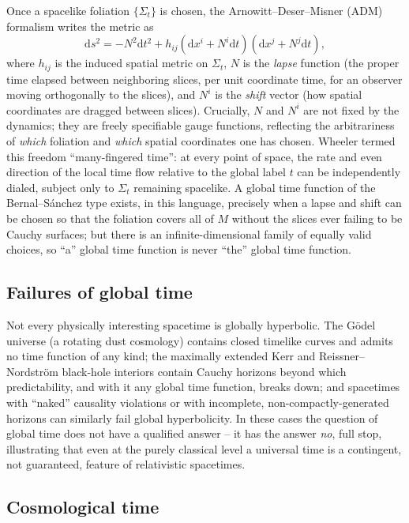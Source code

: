 \documentclass[11pt]{article}
\newcommand{\dd}{\mathrm{d}}
\begin{document}
Once a spacelike foliation $\{\Sigma_t\}$ is chosen, the Arnowitt--Deser--Misner (ADM) formalism writes the metric as
\begin{equation}
\dd s^2 = -N^2\dd t^2 + h_{ij}\left(\dd x^i + N^i \dd t\right)\left(\dd x^j + N^j \dd t\right),
\label{eq:adm}
\end{equation}
where $h_{ij}$ is the induced spatial metric on $\Sigma_t$, $N$ is the \emph{lapse} function (the proper time elapsed between neighboring slices, per unit coordinate time, for an observer moving orthogonally to the slices), and $N^i$ is the \emph{shift} vector (how spatial coordinates are dragged between slices). Crucially, $N$ and $N^i$ are not fixed by the dynamics; they are freely specifiable gauge functions, reflecting the arbitrariness of \emph{which} foliation and \emph{which} spatial coordinates one has chosen. Wheeler termed this freedom ``many-fingered time'': at every point of space, the rate and even direction of the local time flow relative to the global label $t$ can be independently dialed, subject only to $\Sigma_t$ remaining spacelike. A global time function of the Bernal--S\'anchez type exists, in this language, precisely when a lapse and shift can be chosen so that the foliation covers all of $M$ without the slices ever failing to be Cauchy surfaces; but there is an infinite-dimensional family of equally valid choices, so ``a'' global time function is never ``the'' global time function.

\subsection{Failures of global time}

Not every physically interesting spacetime is globally hyperbolic. The G\"odel universe (a rotating dust cosmology) contains closed timelike curves and admits no time function of any kind; the maximally extended Kerr and Reissner--Nordstr\"om black-hole interiors contain Cauchy horizons beyond which predictability, and with it any global time function, breaks down; and spacetimes with ``naked'' causality violations or with incomplete, non-compactly-generated horizons can similarly fail global hyperbolicity. In these cases the question of global time does not have a qualified answer -- it has the answer \emph{no}, full stop, illustrating that even at the purely classical level a universal time is a contingent, not guaranteed, feature of relativistic spacetimes.

\subsection{Cosmological time}
\end{document}
